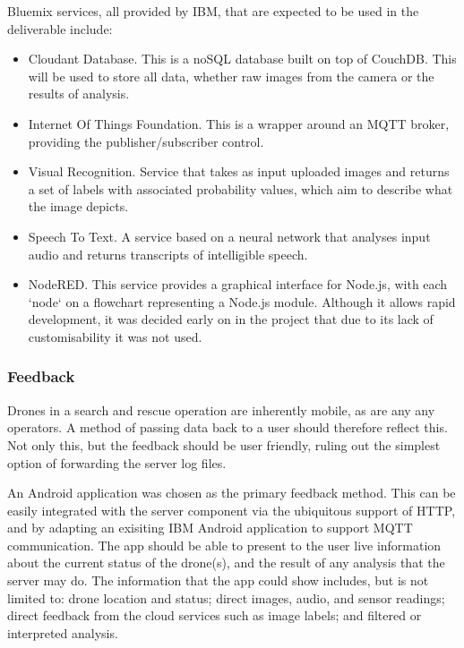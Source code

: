\documentclass{article}
\begin{document}
Bluemix services, all provided by IBM, that are expected to be used in the deliverable include:
\begin{itemize}
    \item Cloudant Database. This is a noSQL database built on top of CouchDB. This will be used to store all data, whether raw images from the camera or the results of analysis.
    \item Internet Of Things Foundation. This is a wrapper around an MQTT broker, providing the publisher/subscriber control.
    \item Visual Recognition. Service that takes as input uploaded images and returns a set of labels with associated probability values, which aim to describe what the image depicts.
    \item Speech To Text. A service based on a neural network that analyses input audio and returns transcripts of intelligible speech.
    \item NodeRED. This service provides a graphical interface for Node.js, with each `node` on a flowchart representing a Node.js module. Although it allows rapid development, it was decided early on in the project that due to its lack of customisability it was not used. 
\end{itemize}


\subsubsection{Feedback}
Drones in a search and rescue operation are inherently mobile, as are any any operators. A method of passing data back to a user should therefore reflect this. Not only this, but the feedback should be user friendly, ruling out the simplest option of forwarding the server log files.

An Android application was chosen as the primary feedback method. This can be easily integrated with the server component via the ubiquitous support of HTTP, and by adapting an exisiting IBM Android application to support MQTT communication\cite{iotStarterAndroid}. The app should be able to present to the user live information about the current status of the drone(s), and the result of any analysis that the server may do. The information that the app could show includes, but is not limited to: drone location and status; direct images, audio, and sensor readings; direct feedback from the cloud services such as image labels; and filtered or interpreted analysis.
\end{document}
